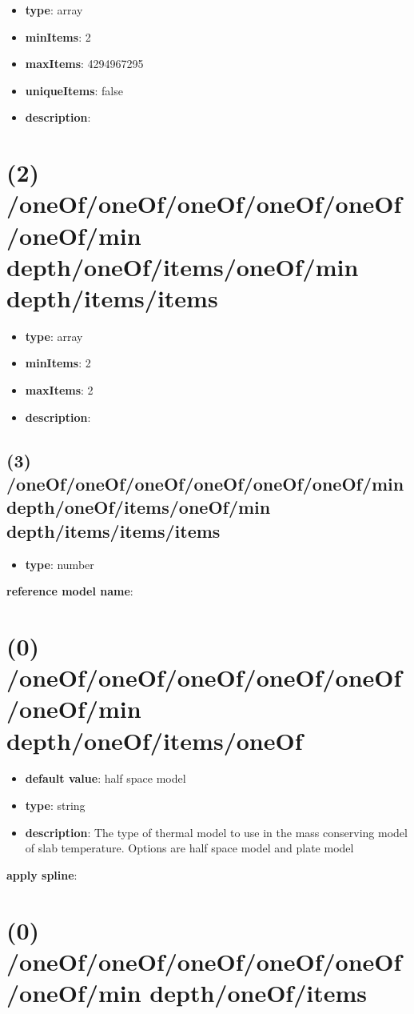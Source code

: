 \begin{itemize}[leftmargin=1em]\item {\bf type}: array
\item {\bf minItems}: 2
\item {\bf maxItems}: 4294967295
\item {\bf uniqueItems}: false
\item {\bf description}: 
\end{itemize}\section{(2) /oneOf/oneOf/oneOf/oneOf/oneOf/oneOf/min depth/oneOf/items/oneOf/min depth/items/items}
\begin{itemize}[leftmargin=2em]\item {\bf type}: array
\item {\bf minItems}: 2
\item {\bf maxItems}: 2
\item {\bf description}: 
\end{itemize}\subsection{(3) /oneOf/oneOf/oneOf/oneOf/oneOf/oneOf/min depth/oneOf/items/oneOf/min depth/items/items/items}
\begin{itemize}[leftmargin=3em]\item {\bf type}: number
\end{itemize}\item {\bf reference model name}: \section{(0) /oneOf/oneOf/oneOf/oneOf/oneOf/oneOf/min depth/oneOf/items/oneOf}
\begin{itemize}[leftmargin=0em]\item {\bf default value}: half space model
\item {\bf type}: string
\item {\bf description}: The type of thermal model to use in the mass conserving model of slab temperature. Options are half space model and plate model
\end{itemize}\item {\bf apply spline}: \section{(0) /oneOf/oneOf/oneOf/oneOf/oneOf/oneOf/min depth/oneOf/items}
